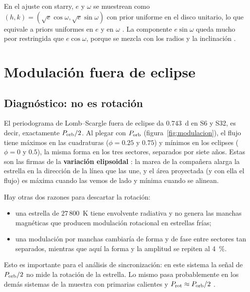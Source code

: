 \documentclass[11pt,a4paper]{article}
\newcommand{\porb}{P_{\rm orb}}
\newcommand{\prot}{P_{\rm rot}}
\begin{document}
En el ajuste con starry, $e$ y $\omega$ se muestrean como
$(h,k)=(\sqrt e\cos\omega,\sqrt e\sin\omega)$ con prior uniforme en el disco unitario, lo que
equivale a priors uniformes en $e$ y en $\omega$ \citep{Eastman2013}. La componente $e\sin\omega$
queda mucho peor restringida que $e\cos\omega$, porque se mezcla con los radios y la inclinación
\citep[efecto foto-excéntrico;][]{Dawson2012}.

\section{Modulación fuera de eclipse}
\label{sec:modulacion}

\subsection{Diagnóstico: no es rotación}
El periodograma de Lomb--Scargle \citep{Lomb1976,Scargle1982,VanderPlas2018} fuera de eclipse da
$0.743$~d en S6 y S32, es decir, exactamente $\porb/2$. Al plegar con $\porb$
(figura~\ref{fig:modulacion}), el flujo tiene máximos en las cuadraturas ($\phi=0.25$ y $0.75$) y
mínimos en los eclipses ($\phi=0$ y $0.5$), la misma forma en los tres sectores, separados por siete
años. Estas son las firmas de la \textbf{variación elipsoidal} \citep{Morris1985,Morris1993}: la
marea de la compañera alarga la estrella en la dirección de la línea que las une, y el área
proyectada (y con ella el flujo) es máxima cuando las vemos de lado y mínima cuando se alinean.

Hay otras dos razones para descartar la rotación:
\begin{itemize}
\item una estrella de $27\,800$~K tiene envolvente radiativa y no genera las manchas magnéticas
  que producen modulación rotacional en estrellas frías;
\item una modulación por manchas cambiaría de forma y de fase entre sectores tan separados,
  mientras que aquí la forma y la amplitud se repiten al 4~\%.
\end{itemize}
Esto es importante para el análisis de sincronización: en este sistema la señal de $\porb/2$ no
mide la rotación de la estrella. Lo mismo pasa probablemente en los demás sistemas de la muestra
con primarias calientes y $\prot\approx\porb/2$ \citep[véase la clasificación entre manchas y
variación elipsoidal en][]{HobsonRitz2025}.
\end{document}
